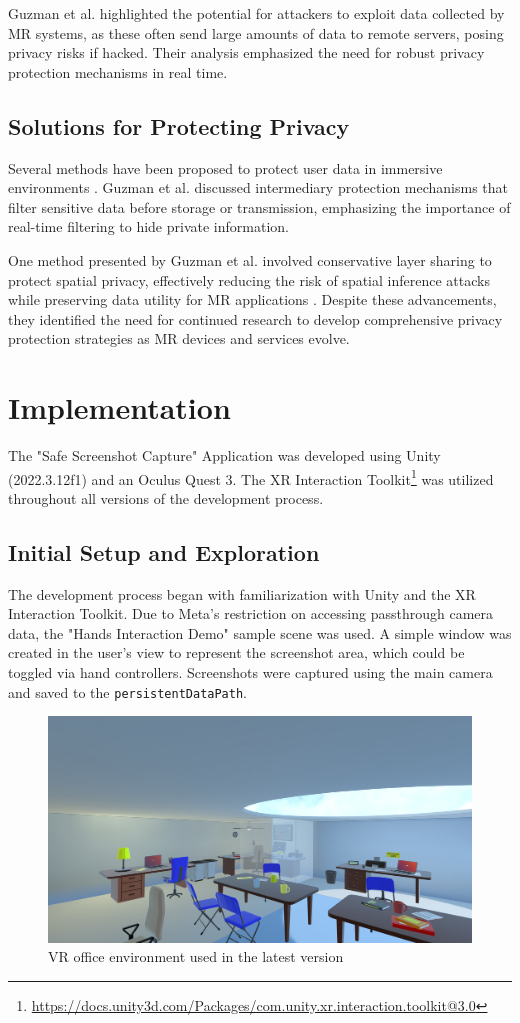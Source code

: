 \documentclass[sigconf,authordraft]{acmart}
\begin{document}
Guzman et al. highlighted the potential for attackers to exploit data collected by MR systems, as these often send large amounts of data to remote servers, posing privacy risks if hacked. Their analysis emphasized the need for robust privacy protection mechanisms in real time.

\subsection{Solutions for Protecting Privacy}
Several methods have been proposed to protect user data in immersive environments \cite{guzman2023privacy}. Guzman et al. discussed intermediary protection mechanisms that filter sensitive data before storage or transmission, emphasizing the importance of real-time filtering to hide private information.

One method presented by Guzman et al. involved conservative layer sharing to protect spatial privacy, effectively reducing the risk of spatial inference attacks while preserving data utility for MR applications \cite{guzman2023privacy}. Despite these advancements, they identified the need for continued research to develop comprehensive privacy protection strategies as MR devices and services evolve.


\section{Implementation}

The "Safe Screenshot Capture" Application was developed using Unity (2022.3.12f1) and an Oculus Quest 3. The XR Interaction Toolkit\footnote{\url{https://docs.unity3d.com/Packages/com.unity.xr.interaction.toolkit@3.0}} was utilized throughout all versions of the development process.

\subsection{Initial Setup and Exploration}
The development process began with familiarization with Unity and the XR Interaction Toolkit. Due to Meta's restriction on accessing passthrough camera data, the "Hands Interaction Demo" sample scene was used. A simple window was created in the user’s view to represent the screenshot area, which could be toggled via hand controllers. Screenshots were captured using the main camera and saved to the \texttt{persistentDataPath}.
\begin{figure}[h]
  \centering
  \includegraphics[width=0.9\linewidth]{Office.png}
  \caption{VR office environment used in the latest version}
  \label{fig:office_environment}
\end{figure}
\end{document}
